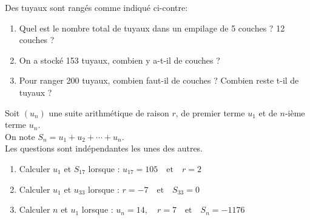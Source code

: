 \documentclass[11pt]{article}
\begin{document}
\begin{exercice}
\begin{multicols}{2}
Des tuyaux sont rangés comme indiqué ci-contre:
\begin{enumerate}
\item Quel est le nombre total de tuyaux dans un empilage de 5 couches ? 12 couches ?
\item On a stocké 153 tuyaux, combien y a-t-il de couches ?
\item Pour ranger 200 tuyaux, combien faut-il de couches ? Combien
reste t-il de tuyaux ?
\end{enumerate}
\columnbreak
\begin{center}
\end{center}
\end{multicols}
\end{exercice}

\begin{exercice}
Soit \((u_n)\) une suite arithmétique de raison \(r\), de premier terme \(u_1\) et de \(n\)-ième terme \(u_n\). \\
On note \(S_n = u_1 + u_2 + \cdots + u_n\). \\
Les questions sont indépendantes les unes des autres.
\begin{enumerate}
\item Calculer \(u_1\) et \(S_{17}\) lorsque : $u_{17} = 105 \quad \text{et} \quad r = 2$
\item Calculer \(u_1\) et \(u_{33}\) lorsque : $r = -7 \quad \text{et} \quad S_{33} = 0$
\item Calculer \(n\) et \(u_1\) lorsque : $u_n = 14, \quad r = 7 \quad \text{et} \quad S_n = -1176$
\end{enumerate}
\end{exercice}
\end{document}
